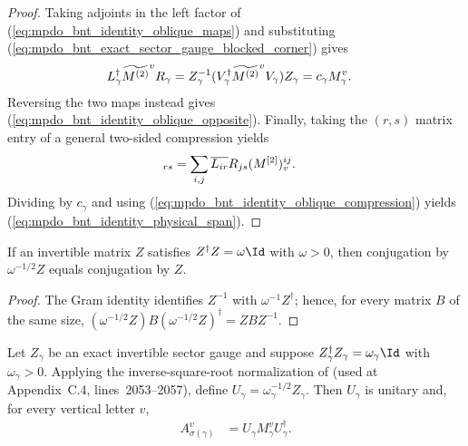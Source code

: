 \begin{proof}\leanok
    Taking adjoints in the left factor of
    (\ref{eq:mpdo_bnt_identity_oblique_maps}) and substituting
    (\ref{eq:mpdo_bnt_exact_sector_gauge_blocked_corner}) gives
    \begin{align}
        L_\gamma^\dagger\widetilde{M^{(2)}}^vR_\gamma
         & =Z_\gamma^{-1}
        (V_\gamma^\dagger\widetilde{M^{(2)}}^vV_\gamma)
        Z_\gamma
        =c_\gamma M_\gamma^v.
        \notag
    \end{align}
    Reversing the two maps instead gives
    (\ref{eq:mpdo_bnt_identity_oblique_opposite}). Finally, taking the
    $(r,s)$ matrix entry of a general two-sided compression yields
    \begin{align}
        [L^\dagger\widetilde{M^{(2)}}^vR]_{rs}
         & =\sum_{i,j}\overline{L_{ir}}R_{js}(M^{[2]})^{ij}_v.
        \notag
    \end{align}
    Dividing by $c_\gamma$ and using
    (\ref{eq:mpdo_bnt_identity_oblique_compression}) yields
    (\ref{eq:mpdo_bnt_identity_physical_span}).
\end{proof}

\begin{lemma}
    \label{thm:normalized_conjugation_of_scalar_gram}
    \leanok
    If an invertible matrix $Z$ satisfies
    $Z^\dagger Z=\omega\Id$ with $\omega>0$, then conjugation by
    $\omega^{-1/2}Z$ equals conjugation by $Z$.
\end{lemma}

\begin{proof}\leanok
    The Gram identity identifies $Z^{-1}$ with
    $\omega^{-1}Z^\dagger$; hence, for every matrix $B$ of the same size,
    $(\omega^{-1/2}Z)B(\omega^{-1/2}Z)^\dagger
        =ZBZ^{-1}$.
\end{proof}

\begin{lemma}
    \label{thm:mpdo_bnt_conditional_identity_marked_unitary_conjugacy}
    \leanok
    Let $Z_\gamma$ be an exact invertible sector gauge and suppose
    $Z_\gamma^\dagger Z_\gamma=\omega_\gamma\Id$ with
    $\omega_\gamma>0$. Applying the inverse-square-root normalization of
    \cite[Proposition~4.13, lines~1903--1908]{Cirac2016MPDO_arXiv} (used at
    Appendix~C.4, lines~2053--2057), define
    $U_\gamma=\omega_\gamma^{-1/2}Z_\gamma$.
    Then $U_\gamma$ is unitary and, for every vertical letter $v$,
    \begin{align}
        A_{\sigma(\gamma)}^v
         & =U_\gamma M_\gamma^v U_\gamma^\dagger.
        \label{eq:mpdo_bnt_conditional_unitary_conjugacy}
    \end{align}
\end{lemma}

